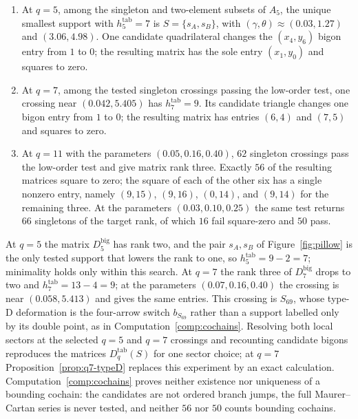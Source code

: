 \begin{computation}\label{comp:cochains}
\begin{enumerate}
\item[(i)] At $q=5$, among the singleton and two-element subsets of $A_5$, the unique smallest
support with $h_5^{\mathrm{tab}}=7$ is $S=\{s_A,s_B\}$, with $(\gamma,\theta)\approx(0.03,1.27)$ and
$(3.06,4.98)$.  One candidate quadrilateral changes the $(x_4,y_6)$ bigon entry from $1$ to $0$; the
resulting matrix has the sole entry $(x_1,y_0)$ and squares to zero.
\item[(ii)] At $q=7$, among the tested singleton crossings passing the low-order test, one crossing near
$(0.042,5.405)$ has $h_7^{\mathrm{tab}}=9$.  Its candidate triangle changes one bigon entry from $1$ to
$0$; the resulting matrix has entries $(6,4)$ and $(7,5)$ and squares to zero.
\item[(iii)] At $q=11$ with the parameters $(0.05,0.16,0.40)$, $62$ singleton crossings pass the low-order
test and give matrix rank three.  Exactly $56$ of the resulting matrices square to zero; the square of each
of the other six has a single nonzero entry, namely $(9,15)$, $(9,16)$, $(0,14)$, and $(9,14)$ for the
remaining three.  At the parameters $(0.03,0.10,0.25)$ the same test returns $66$ singletons of the
target rank, of which $16$ fail square-zero and $50$ pass.
\end{enumerate}
\end{computation}

At $q=5$ the matrix $D_5^{\mathrm{big}}$ has rank two, and the pair $s_A,s_B$ of Figure~\ref{fig:pillow} is
the only tested support that lowers the rank to one, so $h_5^{\mathrm{tab}}=9-2=7$; minimality
holds only within this search.  At $q=7$ the rank three of $D_7^{\mathrm{big}}$ drops to two and
$h_7^{\mathrm{tab}}=13-4=9$; at the parameters $(0.07,0.16,0.40)$ the crossing is near
$(0.058,5.413)$ and gives the same entries.  This crossing is $S_{69}$, whose type-D deformation is the
four-arrow switch $b_{S_{69}}$ rather than a support labelled only by its double point, as in
Computation~\ref{comp:cochains}.    Resolving both local sectors at the selected $q=5$ and $q=7$ crossings and
recounting candidate bigons reproduces the matrices $D_q^{\mathrm{tab}}(S)$ for one sector choice; at $q=7$
Proposition~\ref{prop:q7-typeD} replaces this experiment by an exact calculation.
Computation~\ref{comp:cochains} proves neither existence nor uniqueness of a bounding cochain: the
candidates are not ordered branch jumps, the full Maurer--Cartan series is never tested, and neither $56$
nor $50$ counts bounding cochains.


